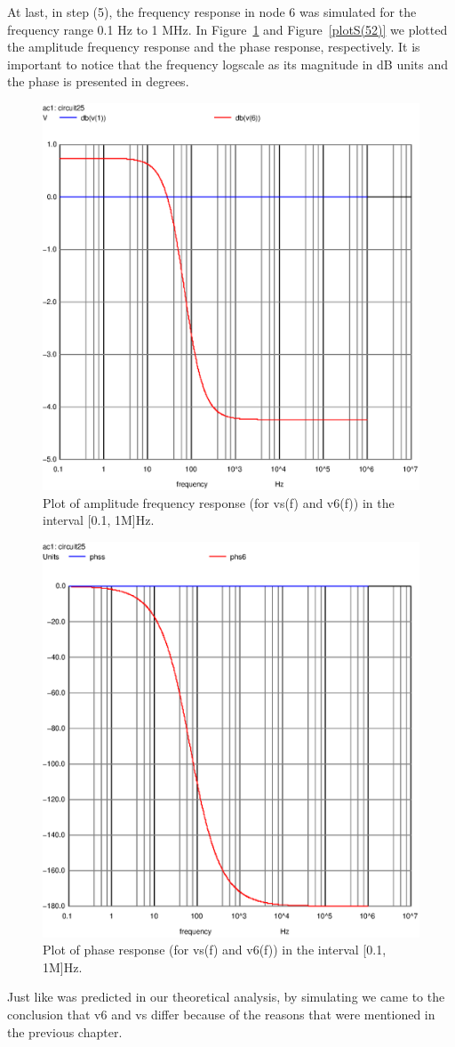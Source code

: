 At last, in step (5), the frequency response in node 6 was simulated  for the frequency range 0.1 Hz to 1 MHz. In Figure~\ref{fig:plotS(51)} and Figure~\ref{plotS(52)} we plotted the amplitude frequency response and the phase response, respectively. It is important to notice that the frequency logscale as its magnitude in dB units and the phase is presented in degrees.

\begin{figure}[h] \centering
\includegraphics[width=0.8\linewidth]{ampresponse.eps}
\caption{Plot of amplitude frequency response (for vs(f) and v6(f)) in the interval [0.1, 1M]Hz.}
\label{fig:plotS(51)}
\end{figure}

\begin{figure}[h] \centering
\includegraphics[width=0.8\linewidth]{phaseresponse.eps}
\caption{Plot of phase response (for vs(f) and v6(f)) in the interval [0.1, 1M]Hz.}
\label{fig:plotS(52)}
\end{figure}

Just like was predicted in our theoretical analysis, by simulating we came to the conclusion that v6 and vs differ because of the reasons that were mentioned in the previous chapter.


